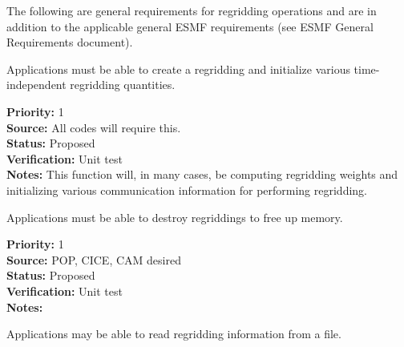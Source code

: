 


The following are general requirements for regridding operations and are in
addition to the applicable general ESMF requirements (see ESMF General 
Requirements document).


Applications must be able to create a regridding and initialize
various time-independent regridding quantities.

\begin{reqlist}
{\bf Priority:} 1 \\
{\bf Source:} All codes will require this. \\
{\bf Status:} Proposed \\
{\bf Verification:} Unit test \\
{\bf Notes:} This function will, in many cases, be computing
             regridding weights and initializing various
             communication information for performing regridding.
\end{reqlist}


Applications must be able to destroy regriddings to free up memory.

\begin{reqlist}
{\bf Priority:} 1 \\
{\bf Source:} POP, CICE, CAM desired \\
{\bf Status:} Proposed \\
{\bf Verification:} Unit test \\
{\bf Notes:} 
\end{reqlist}


Applications may be able to read regridding information from a file.


